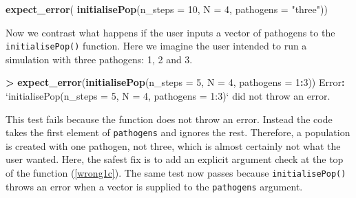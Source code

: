 \documentclass[
]{article}
\newenvironment{Shaded}{\begin{snugshade}}{\end{snugshade}}
\newcommand{\DataTypeTok}[1]{\textcolor[rgb]{0.13,0.29,0.53}{#1}}
\newcommand{\DecValTok}[1]{\textcolor[rgb]{0.00,0.00,0.81}{#1}}
\newcommand{\KeywordTok}[1]{\textcolor[rgb]{0.13,0.29,0.53}{\textbf{#1}}}
\newcommand{\NormalTok}[1]{#1}
\newcommand{\OperatorTok}[1]{\textcolor[rgb]{0.81,0.36,0.00}{\textbf{#1}}}
\newcommand{\StringTok}[1]{\textcolor[rgb]{0.31,0.60,0.02}{#1}}
\begin{document}
\begin{Shaded}
\begin{Highlighting}[]
\KeywordTok{expect_error}\NormalTok{(}
  \KeywordTok{initialisePop}\NormalTok{(}\DataTypeTok{n_steps =} \DecValTok{10}\NormalTok{, }\DataTypeTok{N =} \DecValTok{4}\NormalTok{, }\DataTypeTok{pathogens =} \StringTok{"three"}\NormalTok{))}
\end{Highlighting}
\end{Shaded}

Now we contrast what happens if the user inputs a vector of pathogens to the \texttt{initialisePop()} function.
Here we imagine the user intended to run a simulation with three pathogens: 1, 2 and 3.
\newline
{}\label{wrong1b}

\begin{Shaded}
\begin{Highlighting}[]
\OperatorTok{>}\StringTok{ }\KeywordTok{expect_error}\NormalTok{(}\KeywordTok{initialisePop}\NormalTok{(}\DataTypeTok{n_steps =} \DecValTok{5}\NormalTok{, }\DataTypeTok{N =} \DecValTok{4}\NormalTok{, }\DataTypeTok{pathogens =} \DecValTok{1}\OperatorTok{:}\DecValTok{3}\NormalTok{))}
\NormalTok{Error}\OperatorTok{:}\StringTok{ `}\DataTypeTok{initialisePop(n_steps = 5, N = 4, pathogens = 1:3)}\StringTok{`} 
\NormalTok{  did not throw an error.}
\end{Highlighting}
\end{Shaded}

This test fails because the function does not throw an error.
Instead the code takes the first element of \texttt{pathogens} and ignores the rest.
Therefore, a population is created with one pathogen, not three, which is almost certainly not what the user wanted.
Here, the safest fix is to add an explicit argument check at the top of the function (\ref{wrong1c}).
The same test now passes because \texttt{initialisePop()} throws an error when a vector is supplied to the \texttt{pathogens} argument.
\newline
{}\label{wrong1c}
\end{document}
